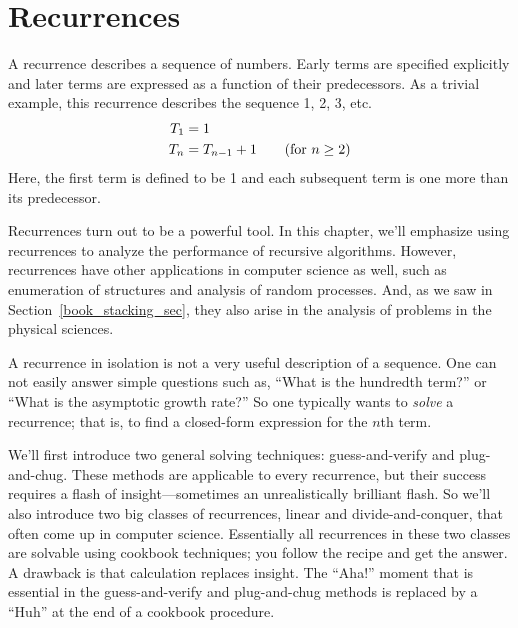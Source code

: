 \chapter{Recurrences}\label{chap:recurrences}


A recurrence describes a sequence of numbers.  Early terms are
specified explicitly and later terms are expressed as a function of
their predecessors.  As a trivial example, this recurrence describes
the sequence 1, 2, 3, etc.
\begin{align*}
T_1 & = 1 \\
T_n & = T_{n-1} + 1 \text{\qquad (for $n \geq 2$)}
\end{align*}
Here, the first term is defined to be 1 and each subsequent term is
one more than its predecessor.

Recurrences turn out to be a powerful tool.  In this chapter, we'll
emphasize using recurrences to analyze the performance of recursive
algorithms.  However, recurrences have other applications in computer
science as well, such as enumeration of structures and analysis of
random processes.  And, as we saw in Section~\ref{book_stacking_sec},
they also arise in the analysis of problems in the physical sciences.

A recurrence in isolation is not a very useful description of a
sequence.  One can not easily answer simple questions such as, ``What
is the hundredth term?'' or ``What is the asymptotic growth rate?''
So one typically wants to \emph{solve} a recurrence; that is, to find a
closed-form expression for the $n$th term.

We'll first introduce two general solving techniques: guess-and-verify
and plug-and-chug.  These methods are applicable to every recurrence,
but their success requires a flash of insight---sometimes an
unrealistically brilliant flash.  So we'll also introduce two big
classes of recurrences, linear and divide-and-conquer, that often come
up in computer science.  Essentially all recurrences in these two
classes are solvable using cookbook techniques; you follow the recipe
and get the answer.  A drawback is that calculation replaces insight.
The ``Aha\@!''  moment that is essential in the guess-and-verify and
plug-and-chug methods is replaced by a ``Huh'' at the end of a
cookbook procedure.

